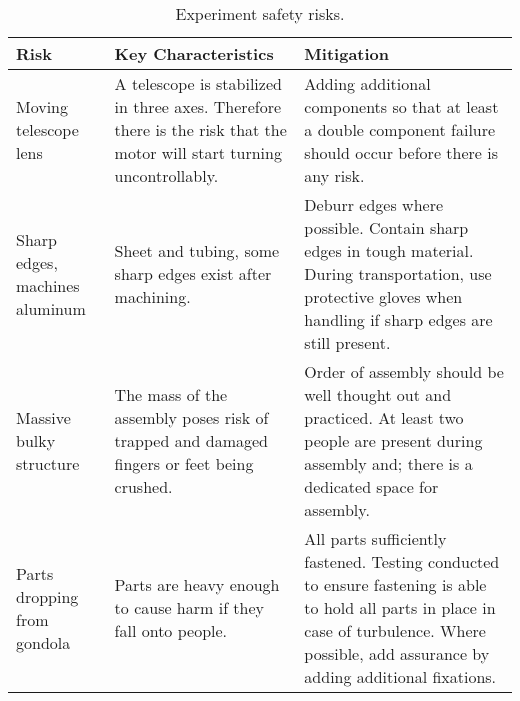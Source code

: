 \begin{table}[H]
    \centering
    \begin{tabular}{|m{}|m{}|m{}|}
    	\hline
    	\textbf{Risk} & \textbf{Key Characteristics} & \textbf{Mitigation} \\\hline

    	Moving telescope lens &
    	A telescope is stabilized in three axes. Therefore there is the risk that the motor will start turning uncontrollably. &
    	Adding additional components so that at least a double component failure should occur before there is any risk. \\\hline

    	Sharp edges, machines aluminum &
    	Sheet and tubing, some sharp edges exist after machining. &
    	Deburr edges where possible. Contain sharp edges in tough material. During transportation, use protective gloves when handling if sharp edges are still present. \\\hline

    	Massive bulky structure &
    	The mass of the assembly poses risk of trapped and damaged fingers or feet being crushed. &
    	Order of assembly should be well thought out and practiced. At least two people are present during assembly and; there is a dedicated space for assembly. \\\hline

    	Parts dropping from gondola &
    	Parts are heavy enough to cause harm if they fall onto people. &
    	All parts sufficiently fastened. Testing conducted to ensure fastening is able to hold all parts in place in case of turbulence. Where possible, add assurance by adding additional fixations. \\\hline

    \end{tabular}
    \caption{Experiment safety risks.}
    \label{tab:safrisk}
\end{table}
